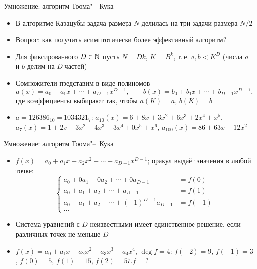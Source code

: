 \documentclass{ca-slides}
\begin{document}
\begin{canvasframe}[shrink=16]{Умножение: алгоритм Тоома"--~Кука}
  \small
  \begin{itemize}
    \item В алгоритме Карацубы задача размера $N$ делилась на три задачи размера $N/2$
    \item \alert{Вопрос}: как получить асимптотически более эффективный алгоритм?
    \item Для фиксированного $D \in \mathbb{N}$ пусть $N = Dk$, $K = B^k$, т.\,е. $a, b < K^D$
      (числа $a$ и $b$ делим на $D$ частей)
    \item Сомножители представим в виде полиномов
      \[a(x) = a_0 + a_1 x + \cdots + a_{D-1} x^{D-1},\qquad
        b(x) = b_0 + b_1 x + \cdots + b_{D-1} x^{D-1},\]
      где коэффициенты выбирают так, чтобы $a(K) = a$, $b(K) = b$
    \item $a = 126386_{10} = 1034321_7$:\quad
      $a_{10}(x) = 6 + 8x + 3x^2 + 6x^3 + 2x^4 + x^5$,\quad
      $a_7(x) = 1 + 2x + 3x^2 + 4x^3 + 3x^4 + 0x^5 + x^6$,\quad
      $a_{100}(x) = 86 + 63x + 12x^2$
  \end{itemize}
\end{canvasframe}

\begin{canvasframe}[shrink=8]{Умножение: алгоритм Тоома"--~Кука}
  \small
  \begin{itemize}
    \item $f(x) = a_0 + a_1 x + a_2 x^2 + \cdots + a_{D-1} x^{D-1}$; оракул выдаёт значения в любой точке:
      \[\left\{\begin{aligned}
        a_0 + 0a_1 + 0a_2 + \cdots + 0a_{D-1} &= f(0)\\
        a_0 + a_1 + a_2 + \cdots + a_{D-1} &= f(1)\\
        a_0 - a_1 + a_2 - \cdots + (-1)^{D-1} a_{D-1} &= f(-1)\\
        \ldots&
      \end{aligned}\right.\]
    \item Система уравнений с $D$ неизвестными имеет единственное решение, если различных точек
      не меньше $D$
    \item $f(x) = a_0 + a_1 x + a_2 x^2 + a_3 x^3 + a_4 x^4$, $\deg f = 4$:\quad
      $f(-2) = 9$, $f(-1) = 3$, $f(0) = 5$, $f(1) = 15$, $f(2) = 57$.\quad $f = {?}$
  \end{itemize}
\end{canvasframe}
\end{document}
